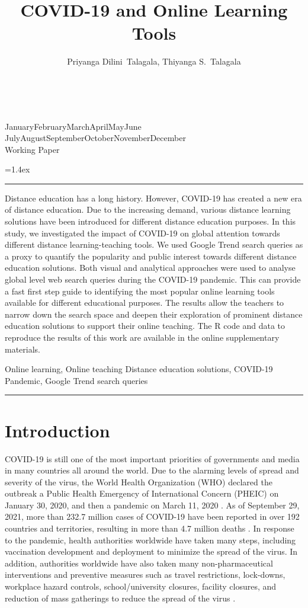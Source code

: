 \documentclass[11pt,a4paper,]{article}
\title{COVID-19 and Online Learning Tools}
\author{Priyanga Dilini~Talagala, Thiyanga S.~Talagala}
\date{\sf\Date~\Month~\Year}
\makeatletter
\def\Date{\number\day}
\def\Month{\ifcase\month\or
 January\or February\or March\or April\or May\or June\or
 July\or August\or September\or October\or November\or December\fi}
\def\Year{\number\year}
\def\showjel{{\large\textsf{\textbf{JEL classification:}}~\@jel}}
\def\cover{{\sffamily\setcounter{page}{0}
        \thispagestyle{empty}
        \vspace*{2cm}
        \begin{center}
        \fbox{\parbox{14cm}{\begin{onehalfspace}\centering\Huge\vspace*{0.3cm}
                \textsf{\textbf{\expandafter{\@title}}}\vspace{1cm}\par
                \LARGE\@author\end{onehalfspace}
        }}
        \end{center}
        \vfill
                \begin{center}\Large
                \Month~\Year\\[1cm]
                Working Paper \@wp
        \end{center}\vspace*{2cm}}}
\def\pageone{{\sffamily\setstretch{1}%
        \thispagestyle{empty}%
        \vbox to \textheight{%
        \raggedright\baselineskip=1.2cm
     {\fontsize{24.88}{30}\sffamily\textbf{\expandafter{\@title}}}
        \vspace{2cm}\par
        \hspace{1cm}\parbox{14cm}{\sffamily\large\@addresses}\vspace{1cm}\vfill
        \hspace{1cm}{\large\Date~\Month~\Year}\\[1cm]
        \hspace{1cm}\showjel\vss}}}
\def\blindtitle{{\sffamily
     \thispagestyle{plain}\raggedright\baselineskip=1.2cm
     {\fontsize{24.88}{30}\sffamily\textbf{\expandafter{\@title}}}\vspace{1cm}\par
        }}
\def\titlepage{{\cover\newpage\pageone\newpage\blindtitle}}
\let\maketitle\titlepage
\newenvironment{keywords}{\par\vspace{0.5cm}\noindent{\sffamily\textbf{Keywords:}}}{\vspace{0.25cm}\par\hrule\vspace{0.5cm}\par}
\renewenvironment{abstract}{\begin{minipage}{\textwidth}\parskip=1.4ex\noindent
\hrule\vspace{0.1cm}\par{\sffamily\textbf{\abstractname}}\newline}
  {\end{minipage}}
\makeatother
\begin{document}
\maketitle
\begin{abstract}
Distance education has a long history. However, COVID-19 has created a new era of distance education. Due to the increasing demand, various distance learning solutions have been introduced for different distance education purposes. In this study, we investigated the impact of COVID-19 on global attention towards different distance learning-teaching tools. We used Google Trend search queries as a proxy to quantify the popularity and public interest towards different distance education solutions. Both visual and analytical approaches were used to analyse global level web search queries during the COVID-19 pandemic. This can provide a fast first step guide to identifying the most popular online learning tools available for different educational purposes. The results allow the teachers to narrow down the search space and deepen their exploration of prominent distance education solutions to support their online teaching. The R code and data to reproduce the results of this work are available in the online supplementary materials.
\end{abstract}
\begin{keywords}
Online learning, Online teaching Distance education solutions, COVID-19 Pandemic, Google Trend search queries
\end{keywords}

\hypertarget{introduction}{%
\section{Introduction}\label{introduction}}

COVID-19 is still one of the most important priorities of governments and media in many countries all around the world. Due to the alarming levels of spread and severity of the virus, the World Health Organization (WHO) declared the outbreak a Public Health Emergency of International Concern (PHEIC) on January 30, 2020, and then a pandemic on March 11, 2020 \autocite{world2020timeline}. As of September 29, 2021, more than 232.7 million cases of COVID-19 have been reported in over 192 countries and territories, resulting in more than 4.7 million deaths \autocite{dong2020interactive}. In response to the pandemic, health authorities worldwide have taken many steps, including vaccination development and deployment to minimize the spread of the virus. In addition, authorities worldwide have also taken many non-pharmaceutical interventions and preventive measures such as travel restrictions, lock-downs, workplace hazard controls, school/university closures, facility closures, and reduction of mass gatherings to reduce the spread of the virus \autocite{chang2020modelling}.
\end{document}
